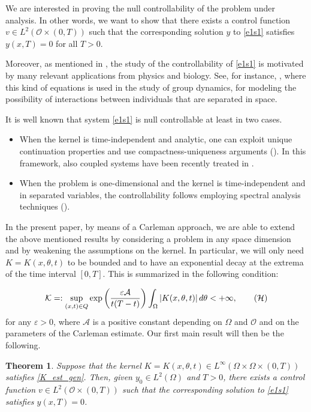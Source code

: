 \documentclass{amsart}    %
\newtheorem{theorem}{\bf Theorem}[section]
\begin{document}
We are interested in proving the null controllability of the problem under analysis. In other words, we want to show that there exists a control function $v\in L^2(\mathcal O\times(0,T))$ such that the corresponding solution $y$ to \eqref{e1s1} satisfies $y(x,T)=0$ for all $T>0$.

Moreover, as mentioned in \cite{fernandez2016null}, the study of the controllability of \eqref{e1s1} is motivated by many relevant applications from physics and biology. See, for instance, \cite[Section 7.9.2]{okubo2013diffusion}, where this kind of equations is used in the study of group dynamics, for modeling the possibility of interactions between individuals that are separated in space. 

It is well known that system \eqref{e1s1} is null controllable at least in two cases.
\begin{itemize}
	\item When the kernel is time-independent and analytic, one can exploit unique continuation properties and use compactness-uniqueness arguments (\cite{fernandez2016null}). In this framework, also coupled systems have been recently treated in \cite{lissy2017internal}.
	\item When the problem is one-dimensional and the kernel is time-independent and in separated variables, the controllability follows employing spectral analysis techniques (\cite{micu2017local}).
\end{itemize}

In the present paper, by means of a Carleman approach, we are able to extend the above mentioned results by considering a problem in any space dimension and by weakening the assumptions on the kernel. In particular, we will only need ${K=K(x,\theta,t)}$ to be bounded and to have an exponential decay at the extrema of the time interval $[0,T]$. This is summarized in the following condition:

\begin{align}\label{K_est_gen}
	\mathcal{K}=:\sup_{(x,t)\in Q} \exp\left(\frac{\varepsilon\mathcal{A}}{t(T-t)}\right)\int_{\Omega} |K(x,\theta,t)|\,d\theta < +\infty, \tag{$\mathcal{H}$}
\end{align}
for any $\varepsilon>0$, where $\mathcal{A}$ is a positive constant depending on $\Omega$ and $\mathcal{O}$ and on the parameters of the Carleman estimate. Our first main result will then be the following.

\begin{theorem}\label{control_thm} 
Suppose that the kernel $K=K(x,\theta,t)\in L^\infty(\Omega\times\Omega\times(0,T))$ satisfies \eqref{K_est_gen}. Then, given $y_0\in L^2(\Omega)$ and $T>0$, there exists a control function $v\in L^2(\mathcal{O}\times (0,T))$ such that the corresponding solution to \eqref{e1s1} satisfies $y(x,T)=0$.
\end{theorem}
\end{document}
